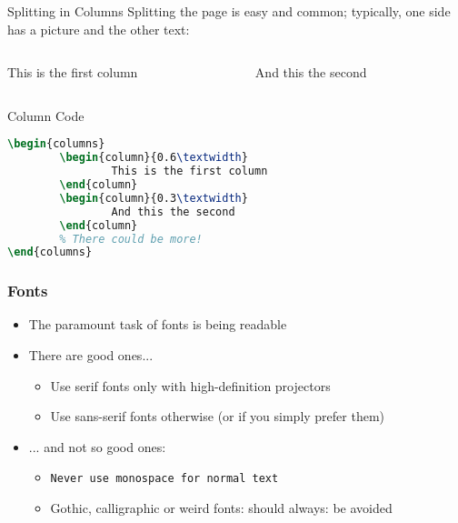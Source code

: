 \documentclass{beamer}
\begin{document}
    \begin{frame}[fragile]{Splitting in Columns}
        Splitting the page is easy and common; typically, one side has a picture and the other text:
        \begin{columns}
            \begin{column}{0.6\textwidth}
                This is the first column
            \end{column}
            \begin{column}{0.3\textwidth}
                And this the second
            \end{column}
        \end{columns}
        \begin{block}{Column Code}
            \begin{lstlisting}[language=TeX]
\begin{columns}
        \begin{column}{0.6\textwidth}
                This is the first column
        \end{column}
        \begin{column}{0.3\textwidth}
                And this the second
        \end{column}
        % There could be more!
\end{columns}\end{lstlisting}
        \end{block}
    \end{frame}

    \begin{frame}[fragile]
        \frametitle{Fonts}
        \begin{itemize}
            \item The paramount task of fonts is being readable
            \item There are good ones...
                \begin{itemize}
                \item {\textrm{Use serif fonts only with high-definition projectors}}
                \item {\textsf{Use sans-serif fonts otherwise (or if you simply prefer them)}}
                \end{itemize}
            \item ... and not so good ones:
                \begin{itemize}
                \item {\texttt{Never use monospace for normal text}}
                \item {\frakfamily Gothic, calligraphic or weird fonts: should always: be
                avoided}
            \end{itemize}
        \end{itemize}
    \end{frame}
\end{document}
